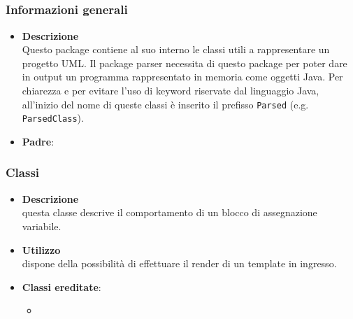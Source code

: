 \subsection{}
\label{\nogloxy{swedesigner::server::project}}
\subsubsection{Informazioni generali}
\begin{itemize}
\item \textbf{Descrizione}\\
Questo package contiene al suo interno le classi utili a rappresentare un progetto UML. Il package parser necessita di questo package per poter dare in output un programma rappresentato in memoria come oggetti Java. Per chiarezza e per evitare l'uso di keyword riservate dal linguaggio Java, all'inizio del nome di queste classi è inserito il prefisso \texttt{Parsed} (e.g. \texttt{ParsedClass}).
\item \textbf{Padre}: \hyperref[\nogloxy{swedesigner::server}]{}
\end{itemize}
\subsubsection{Classi}
\label{\nogloxy{swedesigner::server::project::ParsedAssignment}}
\begin{itemize}
\item \textbf{Descrizione}\\
questa classe descrive il comportamento di un blocco di assegnazione variabile.	
\item \textbf{Utilizzo}\\
dispone della possibilità di effettuare il render di un template in ingresso.
\item \textbf{Classi ereditate}:
\begin{itemize}
\item \hyperref[\nogloxy{swedesigner::server::project::ParsedInstruction}]{}
\end{itemize}
\end{itemize}


